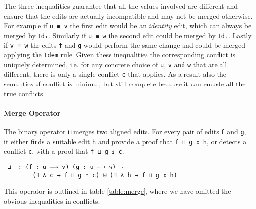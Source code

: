 \documentclass[preprint]{sigplanconf}
\theoremstyle{plain}
\begin{document}
	The three inequalities guarantee that all the values involved are different
        and ensure that the edits are actually incompatible and may not be merged 
        otherwise. For example if \texttt{u ≡ v} the first edit would be an
        \emph{identity} edit, which can always be merged by
        \texttt{Id₁}. Similarly if \texttt{u ≡ w} the second edit could be merged
        by \texttt{Id₂}. Lastly if \texttt{v ≡ w} the edits \texttt{f} and \texttt{g}
        would perform the same change and could be merged applying the \texttt{Idem}
        rule.
        Given these inequalities the corresponding conflict is uniquely determined,
        i.e. for any concrete choice of \texttt{u}, \texttt{v} and \texttt{w} that
        are all different, there is only a single conflict \texttt{c} that applies.
	As a result also the semantics of conflict is minimal, but still complete
        because it can encode all the true conflicts.

	\paragraph{Merge Operator}
	The binary operator \texttt{⊔} merges 
	two aligned edits. For every pair of edits \texttt{f} and \texttt{g}, 
	it either finds a suitable edit \texttt{h} and provide
	a proof that \texttt{f ⊔ g ↧ h}, or detects a conflict \texttt{c}, 
	with a proof that \texttt{f ⊔ g ↥ c}.

\begin{verbatim}
_⊔_ : (f : u ⟿ v) (g : u ⟿ w) →
        (∃ λ c → f ⊔ g ↥ c) ⊎ (∃ λ h → f ⊔ g ↧ h)
\end{verbatim}
	This operator is outlined in table \ref{table:merge}, where we have
        omitted the obvious inequalities in conflicts.
\end{document}
